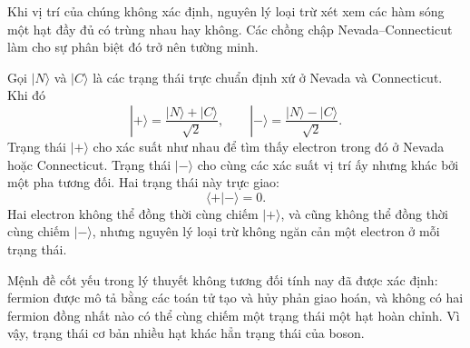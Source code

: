 Khi vị trí của chúng không xác định, nguyên lý loại trừ xét xem các hàm sóng một hạt đầy đủ có trùng nhau hay không. Các chồng chập Nevada--Connecticut làm cho sự phân biệt đó trở nên tường minh.

Gọi \(|N\rangle\) và \(|C\rangle\) là các trạng thái trực chuẩn định xứ ở Nevada và Connecticut. Khi đó
\begin{equation}
|+\rangle=\frac{|N\rangle+|C\rangle}{\sqrt2},
\qquad
|-\rangle=\frac{|N\rangle-|C\rangle}{\sqrt2}.
\end{equation}
Trạng thái \(|+\rangle\) cho xác suất như nhau để tìm thấy electron trong đó ở Nevada hoặc Connecticut. Trạng thái \(|-\rangle\) cho cùng các xác suất vị trí ấy nhưng khác bởi một pha tương đối. Hai trạng thái này trực giao:
\begin{equation}
\langle+|-\rangle=0.
\end{equation}
Hai electron không thể đồng thời cùng chiếm \(|+\rangle\), và cũng không thể đồng thời cùng chiếm \(|-\rangle\), nhưng nguyên lý loại trừ không ngăn cản một electron ở mỗi trạng thái.

\begin{classroomqa}
\end{classroomqa}

\begin{classroomqa}
\end{classroomqa}

Mệnh đề cốt yếu trong lý thuyết không tương đối tính nay đã được xác định: fermion được mô tả bằng các toán tử tạo và hủy phản giao hoán, và không có hai fermion đồng nhất nào có thể cùng chiếm một trạng thái một hạt hoàn chỉnh. Vì vậy, trạng thái cơ bản nhiều hạt khác hẳn trạng thái của boson.

